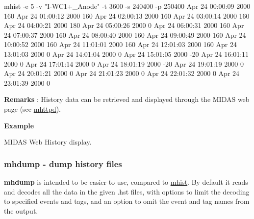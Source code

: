 \begin{DoxyCode}
   mhist -e 5 -v "I-WC1+_Anode" -t 3600 -s 240400 -p 250400
  Apr 24 00:00:09 2000    160
  Apr 24 01:00:12 2000    160
  Apr 24 02:00:13 2000    160
  Apr 24 03:00:14 2000    160
  Apr 24 04:00:21 2000    180
  Apr 24 05:00:26 2000    0
  Apr 24 06:00:31 2000    160
  Apr 24 07:00:37 2000    160
  Apr 24 08:00:40 2000    160
  Apr 24 09:00:49 2000    160
  Apr 24 10:00:52 2000    160
  Apr 24 11:01:01 2000    160
  Apr 24 12:01:03 2000    160
  Apr 24 13:01:03 2000    0
  Apr 24 14:01:04 2000    0
  Apr 24 15:01:05 2000    -20
  Apr 24 16:01:11 2000    0
  Apr 24 17:01:14 2000    0
  Apr 24 18:01:19 2000    -20
  Apr 24 19:01:19 2000    0
  Apr 24 20:01:21 2000    0
  Apr 24 21:01:23 2000    0
  Apr 24 22:01:32 2000    0
  Apr 24 23:01:39 2000    0
\end{DoxyCode}

\begin{DoxyItemize}
\item {\bfseries  Remarks }: History data can be retrieved and displayed through the MIDAS web page (see \hyperlink{RC_mhttpd_utility}{mhttpd}).
\end{DoxyItemize}


\begin{DoxyItemize}
\item {\bfseries  Example } \begin{center}  MIDAS Web History display.  \end{center} 
\end{DoxyItemize}





\label{F_History_logging_idx_mhdump-utility}
\hypertarget{F_History_logging_idx_mhdump-utility}{}
 \label{F_History_logging_idx_history_dump-files}
\hypertarget{F_History_logging_idx_history_dump-files}{}
 \hypertarget{F_History_logging_F_mhdump_utility}{}\subsubsection{mhdump -\/ dump history files}\label{F_History_logging_F_mhdump_utility}
{\bfseries mhdump} is intended to be easier to use, compared to \hyperlink{F_History_logging_F_mhist_utility}{mhist}. By default it reads and decodes all the data in the given .hst files, with options to limit the decoding to specified events and tags, and an option to omit the event and tag names from the output.

